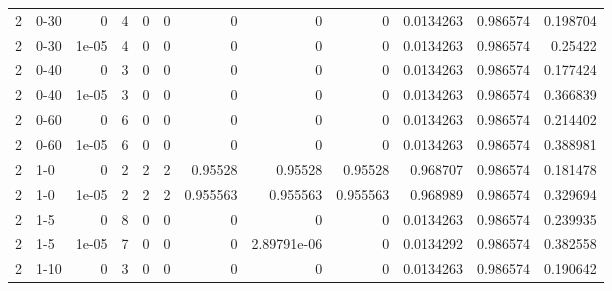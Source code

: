 \begin{tabular}{rlrrrrrrrrrr}
     2 & 0-30   &      0     &           4 &                 0 &                 0 &     0           &     0           &      0           &        0.0134263 &               0.986574 &           0.198704 \\
     2 & 0-30   &      1e-05 &           4 &                 0 &                 0 &     0           &     0           &      0           &        0.0134263 &               0.986574 &           0.25422  \\
     2 & 0-40   &      0     &           3 &                 0 &                 0 &     0           &     0           &      0           &        0.0134263 &               0.986574 &           0.177424 \\
     2 & 0-40   &      1e-05 &           3 &                 0 &                 0 &     0           &     0           &      0           &        0.0134263 &               0.986574 &           0.366839 \\
     2 & 0-60   &      0     &           6 &                 0 &                 0 &     0           &     0           &      0           &        0.0134263 &               0.986574 &           0.214402 \\
     2 & 0-60   &      1e-05 &           6 &                 0 &                 0 &     0           &     0           &      0           &        0.0134263 &               0.986574 &           0.388981 \\
     2 & 1-0    &      0     &           2 &                 2 &                 2 &     0.95528     &     0.95528     &      0.95528     &        0.968707  &               0.986574 &           0.181478 \\
     2 & 1-0    &      1e-05 &           2 &                 2 &                 2 &     0.955563    &     0.955563    &      0.955563    &        0.968989  &               0.986574 &           0.329694 \\
     2 & 1-5    &      0     &           8 &                 0 &                 0 &     0           &     0           &      0           &        0.0134263 &               0.986574 &           0.239935 \\
     2 & 1-5    &      1e-05 &           7 &                 0 &                 0 &     0           &     2.89791e-06 &      0           &        0.0134292 &               0.986574 &           0.382558 \\
     2 & 1-10   &      0     &           3 &                 0 &                 0 &     0           &     0           &      0           &        0.0134263 &               0.986574 &           0.190642 \\

\end{tabular}
